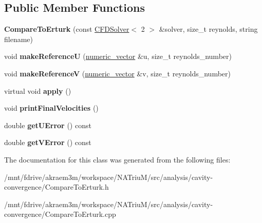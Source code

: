 \subsection*{Public Member Functions}
\begin{DoxyCompactItemize}
\item 
\hypertarget{classnatrium_1_1CompareToErturk_af30a5755f33bef6f6359267a1ff9d203}{
{\bfseries CompareToErturk} (const \hyperlink{classnatrium_1_1CFDSolver}{CFDSolver}$<$ 2 $>$ \&solver, size\_\-t reynolds, string filename)}
\label{classnatrium_1_1CompareToErturk_af30a5755f33bef6f6359267a1ff9d203}

\item 
\hypertarget{classnatrium_1_1CompareToErturk_ad2a631612ec8905f23e448b688f18574}{
void {\bfseries makeReferenceU} (\hyperlink{namespacenatrium_a67c39077adc6634f8fa3762b8eef24c4}{numeric\_\-vector} \&u, size\_\-t reynolds\_\-number)}
\label{classnatrium_1_1CompareToErturk_ad2a631612ec8905f23e448b688f18574}

\item 
\hypertarget{classnatrium_1_1CompareToErturk_af46c6d53efec5821aa0af19f1c789486}{
void {\bfseries makeReferenceV} (\hyperlink{namespacenatrium_a67c39077adc6634f8fa3762b8eef24c4}{numeric\_\-vector} \&v, size\_\-t reynolds\_\-number)}
\label{classnatrium_1_1CompareToErturk_af46c6d53efec5821aa0af19f1c789486}

\item 
\hypertarget{classnatrium_1_1CompareToErturk_a60459ad00ce70a700870ca6775c2dc73}{
virtual void {\bfseries apply} ()}
\label{classnatrium_1_1CompareToErturk_a60459ad00ce70a700870ca6775c2dc73}

\item 
\hypertarget{classnatrium_1_1CompareToErturk_afa6f677970e68219718fa2ce7aedd6ad}{
void {\bfseries printFinalVelocities} ()}
\label{classnatrium_1_1CompareToErturk_afa6f677970e68219718fa2ce7aedd6ad}

\item 
\hypertarget{classnatrium_1_1CompareToErturk_abfb51acdc30b88ff350d46e728c37c2f}{
double {\bfseries getUError} () const }
\label{classnatrium_1_1CompareToErturk_abfb51acdc30b88ff350d46e728c37c2f}

\item 
\hypertarget{classnatrium_1_1CompareToErturk_aadd0e5a187f090010d9fe7bea85e2976}{
double {\bfseries getVError} () const }
\label{classnatrium_1_1CompareToErturk_aadd0e5a187f090010d9fe7bea85e2976}

\end{DoxyCompactItemize}


The documentation for this class was generated from the following files:\begin{DoxyCompactItemize}
\item 
/mnt/fdrive/akraem3m/workspace/NATriuM/src/analysis/cavity-\/convergence/CompareToErturk.h\item 
/mnt/fdrive/akraem3m/workspace/NATriuM/src/analysis/cavity-\/convergence/CompareToErturk.cpp\end{DoxyCompactItemize}
